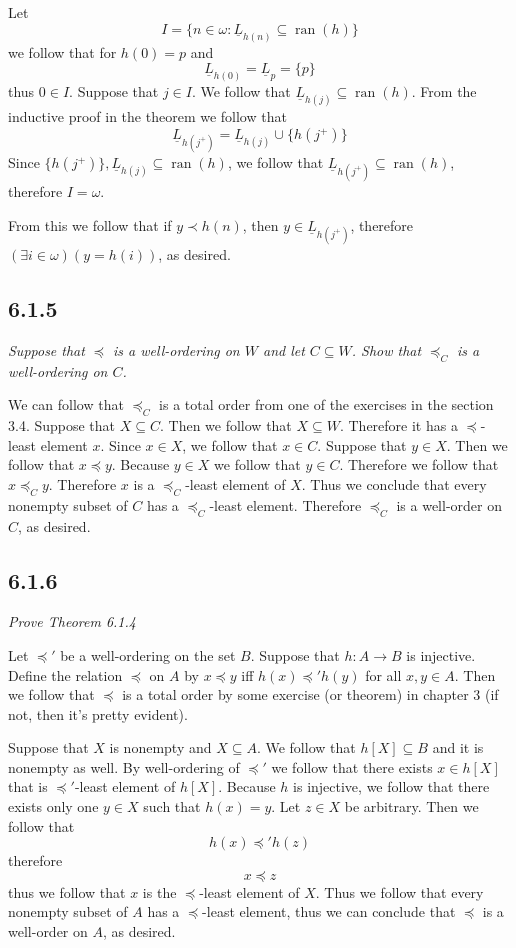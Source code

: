 \documentclass[11pt,oneside,titlepage]{book}
\DeclareMathOperator \ran {ran}
\begin{document}
Let
$$I = \{n \in \omega: \underline{L}_{h(n)} \subseteq \ran(h)\}$$
we follow that for $h(0) = p$ and
$$\underline{L}_{h(0)} = \underline{L}_{p} = \{p\}$$
thus $0 \in I$. Suppose that $j \in I$. We follow that $\underline{L}_{h(j)} \subseteq \ran(h)$.
From the inductive proof in the theorem we follow that
$$\underline{L}_{h(j^+)}  = \underline{L}_{h(j)} \cup \{h(j^+)\}$$
Since $\{h(j^+)\}, \underline{L}_{h(j)} \subseteq \ran(h)$,
we follow that $\underline{L}_{h(j^+)} \subseteq \ran(h)$, therefore $I = \omega$.

From this we follow that if $y \prec h(n)$, then $y \in \underline{L}_{h(j^+)}$, therefore
$(\exists i \in \omega)(y = h(i))$, as desired.

\subsection*{6.1.5}

\textit{Suppose that $\preceq$ is a well-ordering on $W$ and let $C \subseteq W$.
  Show that $\preceq_C$ is a well-ordering on $C$.}

We can follow that $\preceq_C$ is a total order from one of the exercises in the
section 3.4. Suppose that $X \subseteq C$. Then we follow that $X \subseteq W$.
Therefore it has a $\preceq$-least element $x$. Since $x \in X$, we follow that
$x \in C$. Suppose that $y \in X$. Then we follow that $x \preceq y$. Because $y \in X$
we follow that $y \in C$. Therefore we follow that $x \preceq_C y$. Therefore
$x$ is a $\preceq_C$-least element of $X$. Thus we conclude that every
nonempty subset of $C$ has a $\preceq_C$-least element. Therefore $\preceq_C$ is a
well-order on $C$, as desired.

\subsection*{6.1.6}

\textit{Prove Theorem 6.1.4}

Let $\preceq'$ be a well-ordering on the set $B$. Suppose that $h: A \to B$ is
injective. Define the relation $\preceq$ on $A$ by $x \preceq y$ iff $h(x) \preceq' h(y)$
for all $x, y \in A$. Then we follow that $\preceq$ is a total order by
some exercise (or theorem) in chapter 3 (if not, then it's pretty evident).

Suppose that $X$ is nonempty and $X \subseteq A$. We follow that
$h[X] \subseteq B$ and it is nonempty as well. By well-ordering of $\preceq'$ we follow that
there exists $x \in h[X]$ that is $\preceq'$-least element of $h[X]$. Because
$h$ is injective, we follow that there exists only one $y \in X$ such that
$h(x) = y$. Let $z \in X$ be arbitrary. Then we follow that
$$h(x) \preceq' h(z)$$
therefore
$$x \preceq z$$
thus we follow that $x$ is the $\preceq$-least element of $X$. Thus we follow that
every nonempty subset of $A$ has a $\preceq$-least element, thus we can conclude that
$\preceq$ is a well-order on $A$, as desired.
\end{document}
